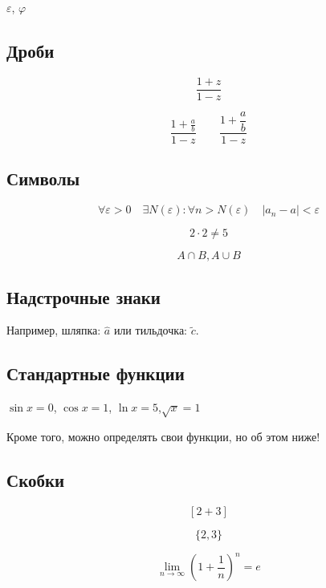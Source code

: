 \documentclass[12pt, a4paper]{article}
\begin{document}
$\varepsilon$, $\varphi$


\subsection{Дроби}

\[\frac{1 + z}{1 - z}\]

\[\frac{1 + \frac{a}{b}}{1 - z} \qquad \frac{1 + \dfrac{a}{b}}{1 - z}\]

\subsection{Символы}

\[ \forall \varepsilon > 0 \quad  \exists N(\varepsilon) : \forall n > N(\varepsilon) \quad |a_n - a| < \varepsilon \]

\[ 2 \cdot 2 \ne 5 \]

\[ A \cap B, A \cup B \]


\subsection{Надстрочные знаки}

Например, шляпка: $\hat{a}$ или тильдочка: $\tilde{c}$.

\subsection{Стандартные функции}

$\sin x = 0$, $ \cos x = 1$, $\ln x = 5$,$\sqrt x = 1$

Кроме того, можно определять свои функции, но об этом ниже!


\subsection{Скобки}

\[  [2+3]  \]

\[ \{2,3\} \]

\[\lim_{n \to \infty} \left(1+\frac{1}{n}\right)^n = e \]


\end{document}
